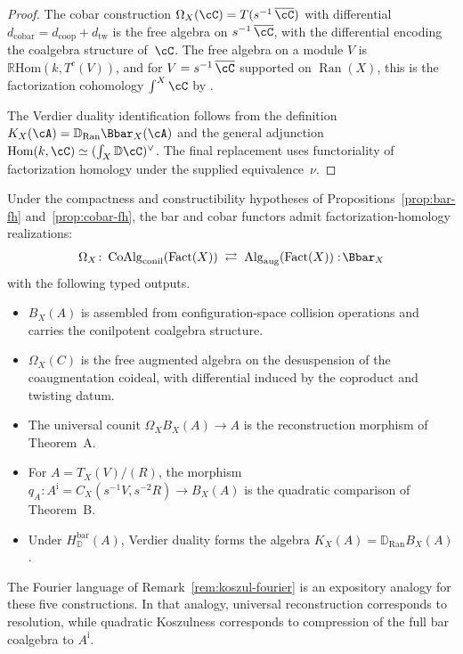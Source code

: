 \begin{proof}
The cobar construction $\Omega_X(\cC) = T(s^{-1}\,\overline{\cC})$ with
differential $d_{\mathrm{cobar}} = d_{\mathrm{coop}} +
d_{\mathrm{tw}}$ is the free algebra on $s^{-1}\,\overline{\cC}$, with
the differential encoding the coalgebra structure of~$\cC$.
The free algebra on a module $V$ is
$\mathbb{R}\mathrm{Hom}(k, T^c(V))$, and for
$V = s^{-1}\,\overline{\cC}$ supported on $\operatorname{Ran}(X)$, this
is the factorization cohomology $\int^X\cC$ by
\cite[Proposition~5.5.2.5]{HA}.

The Verdier duality identification follows from the definition
$K_X(\cA)=\mathbb D_{\mathrm{Ran}}\Bbar_X(\cA)$ and the general
adjunction
$\mathrm{Hom}(k, \cC) \simeq (\int_X \mathbb{D}\cC)^\vee$.
The final replacement uses functoriality of factorization homology
under the supplied equivalence~$\nu$.
\end{proof}

\begin{remark}
\label{rem:bar-cobar-integration}
Under the compactness and constructibility hypotheses of
Propositions~\ref{prop:bar-fh} and~\ref{prop:cobar-fh}, the
bar and cobar functors admit factorization-homology realizations:
\[
\Omega_X \colon
\operatorname{CoAlg}_{\mathrm{conil}}(\operatorname{Fact}(X))
\;\rightleftarrows\;
\operatorname{Alg}_{\mathrm{aug}}(\operatorname{Fact}(X))
:\!\Bbar_X
\]
with the following typed outputs.
\begin{itemize}
\item $B_X(A)$ is assembled from configuration-space collision
operations and carries the conilpotent coalgebra structure.
\item $\Omega_X(C)$ is the free augmented algebra on the desuspension
of the coaugmentation coideal, with differential induced by the
coproduct and twisting datum.
\item The universal counit $\Omega_XB_X(A)\to A$ is the
reconstruction morphism of Theorem~A.
\item For $A=T_X(V)/(R)$, the morphism
$q_A\colon A^{\mathrm i}=C_X(s^{-1}V,s^{-2}R)\to B_X(A)$ is the quadratic
comparison of Theorem~B.
\item Under $H_{\mathbb D}^{\mathrm{bar}}(A)$, Verdier duality forms the algebra
$K_X(A)=\mathbb D_{\operatorname{Ran}}B_X(A)$.
\end{itemize}
The Fourier language of Remark~\ref{rem:koszul-fourier} is an
expository analogy for these five constructions.  In that analogy,
universal reconstruction corresponds to resolution, while quadratic
Koszulness corresponds to compression of the full bar coalgebra to
$A^{\mathrm i}$.
\end{remark}

